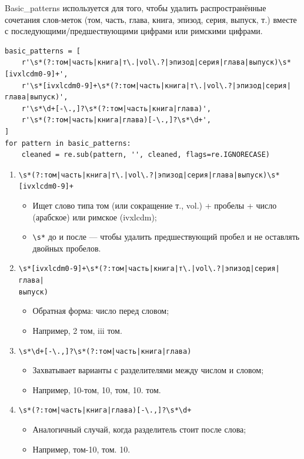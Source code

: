 \documentclass[coursework]{SCWorks}
\begin{document}
    Basic\_patterns используется для того, чтобы удалить распространённые сочетания слов-меток (том, часть, глава, книга,
    эпизод, серия, выпуск, т.) вместе с последующими/предшествующими цифрами или римскими цифрами.

    \begin{verbatim}
basic_patterns = [
    r'\s*(?:том|часть|книга|т\.|vol\.?|эпизод|серия|глава|выпуск)\s*[ivxlcdm0-9]+',
    r'\s*[ivxlcdm0-9]+\s*(?:том|часть|книга|т\.|vol\.?|эпизод|серия|глава|выпуск)',
    r'\s*\d+[-\.,]?\s*(?:том|часть|книга|глава)',
    r'\s*(?:том|часть|книга|глава)[-\.,]?\s*\d+',
]
for pattern in basic_patterns:
    cleaned = re.sub(pattern, '', cleaned, flags=re.IGNORECASE)
    \end{verbatim}

    \begin{enumerate}
        \item \verb~\s*(?:том|часть|книга|т\.|vol\.?|эпизод|серия|глава|выпуск)\s*[ivxlcdm0-9]+~
        \begin{itemize}
            \item Ищет слово типа том (или сокращение т., vol.) + пробелы + число (арабское) или римское (ivxlcdm);
            \item \verb|\s*| до и после — чтобы удалить предшествующий пробел и не оставлять двойных пробелов.
        \end{itemize}

        \item \verb~\s*[ivxlcdm0-9]+\s*(?:том|часть|книга|т\.|vol\.?|эпизод|серия|глава|~ \\\verb~выпуск)~
        \begin{itemize}
            \item Обратная форма: число перед словом;
            \item Например, 2 том, iii том.
        \end{itemize}

        \item \verb~\s*\d+[-\.,]?\s*(?:том|часть|книга|глава)~
        \begin{itemize}
            \item Захватывает варианты с разделителями между числом и словом;
            \item Например, 10-том, 10, том, 10. том.
        \end{itemize}

        \item \verb~\s*(?:том|часть|книга|глава)[-\.,]?\s*\d+~
        \begin{itemize}
            \item Аналогичный случай, когда разделитель стоит после слова;
            \item Например, том-10, том. 10.
        \end{itemize}
    \end{enumerate}
\end{document}
